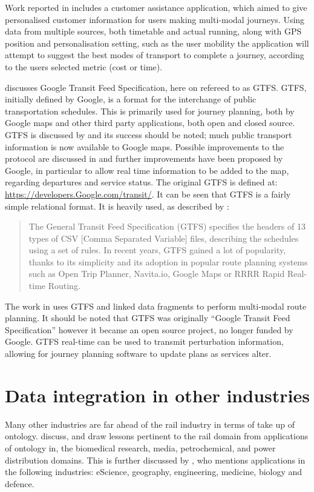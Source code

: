 Work reported in \citet{Verstichel2014} includes a customer assistance application, which aimed to give personalised customer information for users making multi-modal journeys. Using data from multiple sources, both timetable and actual running, along with GPS position and personalisation setting, such as the user mobility the application will attempt to suggest the best modes of transport to complete a journey, according to the users selected metric (cost or time). 

\citet{Morris2016} discusses Google Transit Feed Specification, here on refereed to as GTFS. GTFS, initially defined by Google, is a format for the interchange of public transportation schedules. This is primarily used for journey planning, both by Google maps and other third party applications, both open and closed source.  GTFS is discussed by \citet{Santos2014} and its success should be noted; much public transport information is now available to Google maps. Possible improvements to the protocol are discussed in \citet{Santos2014} and further improvements have been proposed by Google, in particular to allow real time information to be added to the map, regarding departures and service status. The original GTFS is defined at: \url{https://developers.Google.com/transit/}. It can be seen that GTFS is a fairly simple relational format. It is heavily used, as described by \citet{Colpaert}:

\begin{quote}
The General Transit Feed Specification (GTFS) specifies the headers of 13 types of CSV [Comma Separated Variable] files, describing the schedules using a set of rules. In recent years, GTFS gained a lot of popularity, thanks to its simplicity and its adoption in popular route planning systems such as Open Trip Planner, Navita.io, Google Maps or RRRR Rapid Real-time Routing.
\end{quote}

The work in \citet{Colpaert} uses GTFS and linked data fragments to perform multi-modal route planning. It should be noted that GTFS was originally ``Google Transit Feed Specification'' however it became an open source project, no longer funded by Google. GTFS real-time can be used to transmit perturbation information, allowing for journey planning software to update plans as services alter. 


\section{Data integration in other industries}
Many other industries are far ahead of the rail industry in terms of take up of ontology. \citet{Morris2014} discuss, and draw lessons pertinent to the rail domain from applications of ontology in, the biomedical research, media, petrochemical, and power distribution domains. This is further discussed by \citet{Horrocks2007}, who mentions applications in the following industries: eScience, geography, engineering, medicine, biology and defence.


